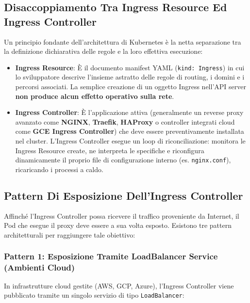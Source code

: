 \documentclass[11pt, a4paper]{article}
\begin{document}
\subsection{Disaccoppiamento Tra Ingress Resource Ed Ingress Controller}
Un principio fondante dell'architettura di Kubernetes è la netta separazione tra la definizione dichiarativa delle regole e la loro effettiva esecuzione:
\begin{itemize}[noitemsep]
    \item \textbf{Ingress Resource}: È il documento manifest YAML (\texttt{kind: Ingress}) in cui lo sviluppatore descrive l'insieme astratto delle regole di routing, i domini e i percorsi associati. La semplice creazione di un oggetto Ingress nell'API server \textbf{non produce alcun effetto operativo sulla rete}.
    \item \textbf{Ingress Controller}: È l'applicazione attiva (generalmente un reverse proxy avanzato come \textbf{NGINX}, \textbf{Traefik}, \textbf{HAProxy} o controller integrati cloud come \textbf{GCE Ingress Controller}) che deve essere preventivamente installata nel cluster. L'Ingress Controller esegue un loop di riconciliazione: monitora le Ingress Resource create, ne interpreta le specifiche e riconfigura dinamicamente il proprio file di configurazione interno (es. \texttt{nginx.conf}), ricaricando i processi a caldo.
\end{itemize}

\subsection{Pattern Di Esposizione Dell'Ingress Controller}
Affinché l'Ingress Controller possa ricevere il traffico proveniente da Internet, il Pod che esegue il proxy deve essere a sua volta esposto. Esistono tre pattern architetturali per raggiungere tale obiettivo:


\subsubsection{Pattern 1: Esposizione Tramite LoadBalancer Service (Ambienti Cloud)}
In infrastrutture cloud gestite (AWS, GCP, Azure), l'Ingress Controller viene pubblicato tramite un singolo servizio di tipo \texttt{LoadBalancer}:
\end{document}
